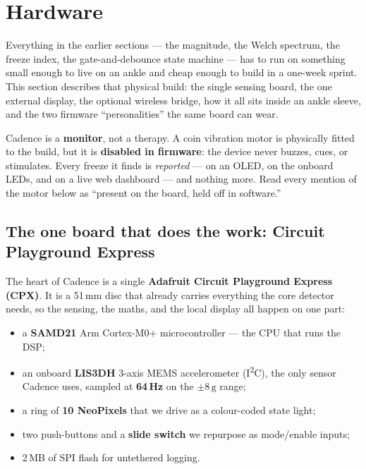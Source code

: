 \section{Hardware}
\label{sec:hardware}

Everything in the earlier sections --- the magnitude, the Welch spectrum, the
freeze index, the gate-and-debounce state machine --- has to run on something small
enough to live on an ankle and cheap enough to build in a one-week sprint. This
section describes that physical build: the single sensing board, the one external
display, the optional wireless bridge, how it all sits inside an ankle sleeve, and
the two firmware ``personalities'' the same board can wear.

\begin{keyidea}
Cadence is a \textbf{monitor}, not a therapy. A coin vibration motor is physically
fitted to the build, but it is \textbf{disabled in firmware}: the device never buzzes,
cues, or stimulates. Every freeze it finds is \emph{reported} --- on an OLED, on the
onboard LEDs, and on a live web dashboard --- and nothing more. Read every mention of
the motor below as ``present on the board, held off in software.''
\end{keyidea}

\subsection{The one board that does the work: Circuit Playground Express}

The heart of Cadence is a single \textbf{Adafruit Circuit Playground Express (CPX)}.
It is a 51\,mm disc that already carries everything the core detector needs, so the
sensing, the maths, and the local display all happen on one part:

\begin{itemize}
  \item a \textbf{SAMD21} Arm Cortex-M0+ microcontroller --- the CPU that runs the DSP;
  \item an onboard \textbf{LIS3DH} 3-axis MEMS accelerometer (I\textsuperscript{2}C),
        the only sensor Cadence uses, sampled at \textbf{64\,Hz} on the
        \(\pm 8\,\mathrm{g}\) range;
  \item a ring of \textbf{10 NeoPixels} that we drive as a colour-coded state light;
  \item two push-buttons and a \textbf{slide switch} we repurpose as mode/enable inputs;
  \item 2\,MB of SPI flash for untethered logging.
\end{itemize}

